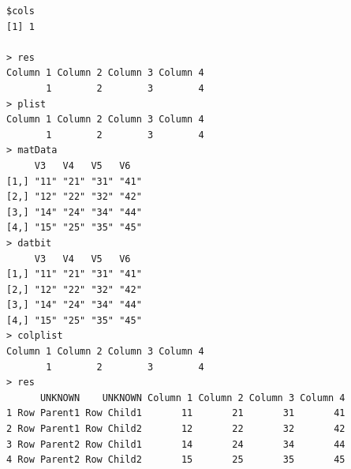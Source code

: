\documentclass[a4paper]{article}
\begin{document}
\begin{verbatim}
$cols
[1] 1

> res 
Column 1 Column 2 Column 3 Column 4 
       1        2        3        4 
> plist 
Column 1 Column 2 Column 3 Column 4 
       1        2        3        4 
> matData 
     V3   V4   V5   V6  
[1,] "11" "21" "31" "41"
[2,] "12" "22" "32" "42"
[3,] "14" "24" "34" "44"
[4,] "15" "25" "35" "45"
> datbit 
     V3   V4   V5   V6  
[1,] "11" "21" "31" "41"
[2,] "12" "22" "32" "42"
[3,] "14" "24" "34" "44"
[4,] "15" "25" "35" "45"
> colplist 
Column 1 Column 2 Column 3 Column 4 
       1        2        3        4 
> res 
      UNKNOWN    UNKNOWN Column 1 Column 2 Column 3 Column 4
1 Row Parent1 Row Child1       11       21       31       41
2 Row Parent1 Row Child2       12       22       32       42
3 Row Parent2 Row Child1       14       24       34       44
4 Row Parent2 Row Child2       15       25       35       45
\end{verbatim}

\newpage
\end{document}

